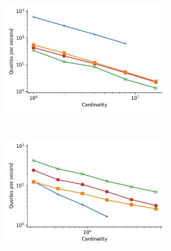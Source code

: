 \begin{figure}
\begin{subfigure}[b]{0.47\textwidth}
        \label{fig:results:sift-scaling}
    \end{subfigure}%
    \begin{subfigure}[b]{0.47\textwidth}
        \includegraphics[width=0.95\textwidth]{plots/random_PermutedBall_10_throughput.png}
        \label{fig:results:random-scaling}
    \end{subfigure}%
    \\
    \begin{subfigure}[b]{0.47\textwidth}
        \includegraphics[width=0.95\textwidth]{plots/silva-SSU-Ref_PermutedBall_10_throughput.png}
        \label{fig:results:silva-scaling}
    \end{subfigure}%
    \begin{subfigure}[b]{0.47\textwidth}

\end{subfigure}
\end{figure}
